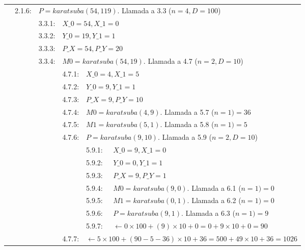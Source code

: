 \documentclass[titlepage,a4paper]{article}
\begin{document}
\begin{longtable}[r]{lllllll}
\multicolumn{2}{l}{}     & 2.1.6:     & \multicolumn{4}{l}{$P=karatsuba(54,119)$. Llamada a 3.3 ($n=4,D=100$)}     \\
\multicolumn{3}{l}{}     & 3.3.1:     & \multicolumn{3}{l}{$X\_0=54, X\_1=0$}     \\
\multicolumn{3}{l}{}     & 3.3.2:     & \multicolumn{3}{l}{$Y\_0=19, Y\_1=1$}     \\
\multicolumn{3}{l}{}     & 3.3.3:     & \multicolumn{3}{l}{$P\_X=54, P\_Y=20$}     \\
\multicolumn{3}{l}{}     & 3.3.4:     & \multicolumn{3}{l}{$M0=karatsuba(54,19)$. Llamada a 4.7 ($n=2,D=10$)}     \\
\multicolumn{4}{l}{}     & 4.7.1:     & \multicolumn{2}{l}{$X\_0=4, X\_1=5$}     \\
\multicolumn{4}{l}{}     & 4.7.2:     & \multicolumn{2}{l}{$Y\_0=9, Y\_1=1$}     \\
\multicolumn{4}{l}{}     & 4.7.3:     & \multicolumn{2}{l}{$P\_X=9, P\_Y=10$}     \\
\multicolumn{4}{l}{}     & 4.7.4:     & \multicolumn{2}{l}{$M0=karatsuba(4,9)$. Llamada a 5.7 ($n=1) = \boxed{36}$}     \\
\multicolumn{4}{l}{}     & 4.7.5:     & \multicolumn{2}{l}{$M1=karatsuba(5,1)$. Llamada a 5.8 ($n=1) = \boxed{5}$}     \\
\multicolumn{4}{l}{}     & 4.7.6:     & \multicolumn{2}{l}{$P=karatsuba(9,10)$. Llamada a 5.9 ($n=2,D=10$)}     \\
\multicolumn{5}{l}{}     & 5.9.1:     & \multicolumn{1}{l}{$X\_0=9, X\_1=0$}     \\
\multicolumn{5}{l}{}     & 5.9.2:     & \multicolumn{1}{l}{$Y\_0=0, Y\_1=1$}     \\
\multicolumn{5}{l}{}     & 5.9.3:     & \multicolumn{1}{l}{$P\_X=9, P\_Y=1$}     \\
\multicolumn{5}{l}{}     & 5.9.4:     & \multicolumn{1}{l}{$M0=karatsuba(9,0)$. Llamada a 6.1 ($n=1) = \boxed{0}$}     \\
\multicolumn{5}{l}{}     & 5.9.5:     & \multicolumn{1}{l}{$M1=karatsuba(0,1)$. Llamada a 6.2 ($n=1) = \boxed{0}$}     \\
\multicolumn{5}{l}{}     & 5.9.6:     & \multicolumn{1}{l}{$P=karatsuba(9,1)$. Llamada a 6.3 ($n=1) = \boxed{9}$}     \\
\multicolumn{5}{l}{}     & 5.9.7:     & \multicolumn{1}{l}{$\leftarrow 0\times 100 + (9)\times 10 + 0 =  0+ 9\times 10 + 0 = \boxed{90}$}     \\
\multicolumn{4}{l}{}     & 4.7.7:     & \multicolumn{2}{l}{$\leftarrow 5\times 100 + (90-5-36)\times 10 + 36 =  500 + 49\times 10 + 36 = \boxed{1026}$}     \\

\end{longtable}
\end{document}
